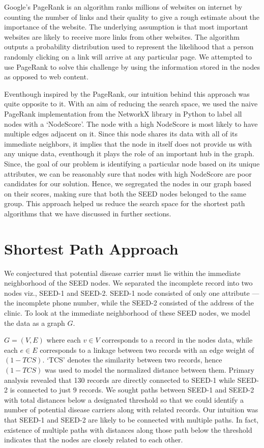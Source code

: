 \documentclass{article} %
\begin{document}
Google's PageRank is an algorithm ranks millions of websites on internet by counting the number of links and their quality to give a rough estimate about the importance of the website. The underlying assumption is that most important websites are likely to receive more links from other websites. The algorithm outputs a probability distribution used to represent the likelihood that a person randomly clicking on a link will arrive at any particular page. We attempted to use PageRank to solve this challenge by using the information stored in the nodes as opposed to web content. 

Eventhough inspired by the PageRank, our intuition behind this approach was quite opposite to it. With an aim of reducing the search space, we used the naive PageRank implementation from the NetworkX library in Python to label all nodes with a `NodeScore'. The node with a high NodeScore is most likely to have multiple edges adjacent on it. Since this node shares its data with all of its immediate neighbors, it implies that the node in itself does not provide us with any unique data, eventhough it plays the role of an important hub in the graph. Since, the goal of our problem is identifying a particular node based on its unique attributes, we can be reasonably sure that nodes with high NodeScore are poor candidates for our solution. Hence, we segregated the nodes in our graph based on their scores, making sure that both the SEED nodes belonged to the same group. This approach helped us reduce the search space for the shortest path algorithms that we have discussed in further sections. 



\section{Shortest Path Approach}

We conjectured that potential disease carrier must lie within the immediate neighborhood of the SEED nodes. We separated the incomplete record into two nodes viz., SEED-1 and SEED-2. SEED-1 node consisted of only one attribute --- the incomplete phone number, while the SEED-2 consisted of the address of the clinic. To look at the immediate neighborhood of these SEED nodes, we model the data as a graph $G$.

$G = (V, E)$ where each $v \in V$ corresponds to a record in the nodes data, while each $e \in E$ corresponds to a linkage between two records with an edge weight of $(1 - TCS)$. `TCS' denotes the similarity between two records, hence $(1 - TCS)$ was used to model the normalized distance between them. Primary analysis revealed that 130 records are directly connected to SEED-1 while SEED-2 is connected to just 9 records. We sought paths between SEED-1 and SEED-2 with total distances below a designated threshold so that we could identify a number of potential disease carriers along with related records. Our intuition was that SEED-1 and SEED-2 are likely to be connected with multiple paths. In fact, existence of multiple paths with distances along those path below the threshold indicates that the nodes are closely related to each other.
\end{document}
